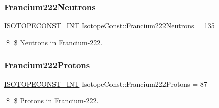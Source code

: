 \subsubsection{\texorpdfstring{Francium222\+Neutrons}{Francium222Neutrons}}
{\footnotesize\ttfamily \mbox{\hyperlink{group___isotope_const-_macros_ga5f18360b3e99483a35c32d789e62621c}{I\+S\+O\+T\+O\+P\+E\+C\+O\+N\+S\+T\+\_\+\+I\+NT}} Isotope\+Const\+::\+Francium222\+Neutrons = 135}

\$ \$ Neutrons in Francium-\/222. \mbox{\label{group___isotope_const-_francium-_fr222_ga8ca3941a869904d7593249fd9c12a69a}} 
\subsubsection{\texorpdfstring{Francium222\+Protons}{Francium222Protons}}
{\footnotesize\ttfamily \mbox{\hyperlink{group___isotope_const-_macros_ga5f18360b3e99483a35c32d789e62621c}{I\+S\+O\+T\+O\+P\+E\+C\+O\+N\+S\+T\+\_\+\+I\+NT}} Isotope\+Const\+::\+Francium222\+Protons = 87}

\$ \$ Protons in Francium-\/222. 